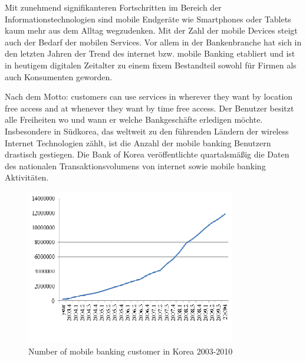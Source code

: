 Mit zunehmend signifikanteren Fortschritten im Bereich der Informationstechnologien sind mobile Endgeräte wie Smartphones oder Tablets kaum mehr aus dem Alltag wegzudenken. Mit der Zahl der mobile Devices steigt auch der Bedarf der mobilen Services. Vor allem in der Bankenbranche hat sich in den letzten Jahren der Trend des internet bzw. mobile Banking etabliert und ist in heutigem digitalen Zeitalter zu einem fixem Bestandteil sowohl für Firmen als auch Konsumenten geworden. 

Nach dem Motto: \glqq customers can use services in wherever they want by location free access and at whenever they want by time free access. \grqq Der Benutzer besitzt alle Freiheiten wo und wann er welche Bankgeschäfte erledigen möchte. Insbesondere in Südkorea, das weltweit zu den führenden Ländern der wireless Internet Technologien zählt, ist die Anzahl der mobile banking Benutzern drastisch gestiegen. Die Bank of Korea veröffentlichte quartalsmäßig die Daten des nationalen Transaktionsvolumens von internet sowie mobile banking Aktivitäten.\cite{Jung2011}
\begin{figure}[h!]
	\caption{Number of mobile banking customer in Korea 2003-2010}
	\centering
		\includegraphics[scale=1.0]{figures/Jung2011}
\end{figure}  